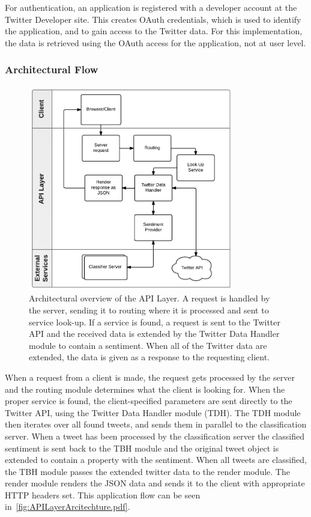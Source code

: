 For authentication, an application is registered with a developer account at the Twitter Developer site. This creates OAuth credentials, which is used to identify the application, and to gain access to the Twitter data. For this implementation, the data is retrieved using the OAuth access for the application, not at user level. 

\subsubsection{Architectural Flow}

\begin{figure}[htb!]
 \begin{center}
     \includegraphics[width=0.8\textwidth]{../img/APILayerArcitechture.pdf}
 \end{center}
 \caption[Architectural overview of the API Layer.]{Architectural overview of the API Layer. A request is handled by the server, sending it to routing where it is processed and sent to service look-up. If a service is found, a request is sent to the Twitter API and the received data is extended by the Twitter Data Handler module to contain a sentiment. When all of the Twitter data are extended, the data is given as a response to the requesting client.}
 \label{fig:APILayerArcitechture.pdf}
\end{figure}

When a request from a client is made, the request gets processed by the server and the routing module determines what the client is looking for. When the proper service is found, the client-specified parameters are sent directly to the Twitter API, using the Twitter Data Handler module (TDH). The TDH module then iterates over all found tweets, and sends them in parallel to the classification server. When a tweet has been processed by the classification server the classified sentiment is sent back to the TBH module and the original tweet object is extended to contain a property with the sentiment. When all tweets are classified, the TBH module passes the extended twitter data to the render module. The render module renders the JSON data and sends it to the client with appropriate HTTP headers set. This application flow can be seen in~\autoref{fig:APILayerArcitechture.pdf}.


